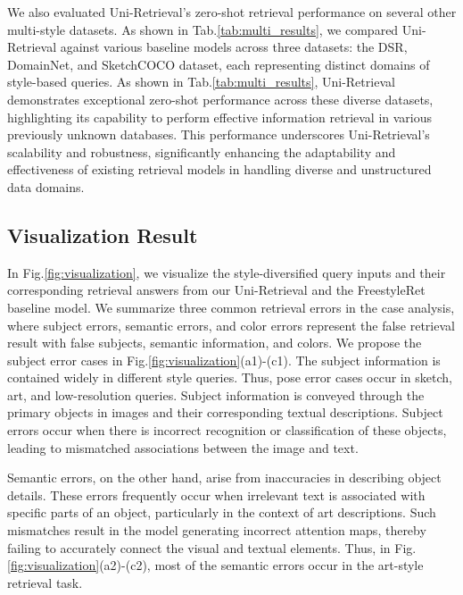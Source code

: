 We also evaluated Uni-Retrieval’s zero-shot retrieval performance on several other multi-style datasets. As shown in Tab.\ref{tab:multi_results}, we compared Uni-Retrieval against various baseline models across three datasets: the DSR, DomainNet, and SketchCOCO dataset, each representing distinct domains of style-based queries. 
As shown in Tab.\ref{tab:multi_results}, Uni-Retrieval demonstrates exceptional zero-shot performance across these diverse datasets, highlighting its capability to perform effective information retrieval in various previously unknown databases.
This performance underscores Uni-Retrieval’s scalability and robustness, significantly enhancing the adaptability and effectiveness of existing retrieval models in handling diverse and unstructured data domains.

\subsection{Visualization Result}


In Fig.\ref{fig:visualization}, we visualize the style-diversified query inputs and their corresponding retrieval answers from our Uni-Retrieval and the FreestyleRet baseline model. We summarize three common retrieval errors in the case analysis, where subject errors, semantic errors, and color errors represent the false retrieval result with false subjects, semantic information, and colors. We propose the subject error cases in Fig.\ref{fig:visualization}(a1)-(c1). The subject information is contained widely in different style queries. Thus, pose error cases occur in sketch, art, and low-resolution queries. 
Subject information is conveyed through the primary objects in images and their corresponding textual descriptions. Subject errors occur when there is incorrect recognition or classification of these objects, leading to mismatched associations between the image and text.

Semantic errors, on the other hand, arise from inaccuracies in describing object details. These errors frequently occur when irrelevant text is associated with specific parts of an object, particularly in the context of art descriptions. Such mismatches result in the model generating incorrect attention maps, thereby failing to accurately connect the visual and textual elements. Thus, in Fig.\ref{fig:visualization}(a2)-(c2), most of the semantic errors occur in the art-style retrieval task. 

